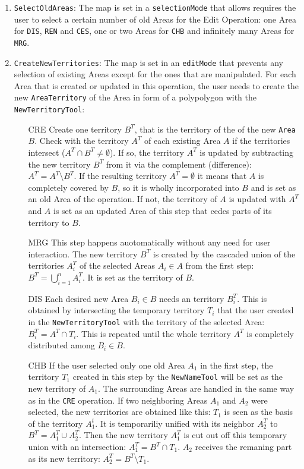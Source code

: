 \begin{enumerate}
  \item \texttt{SelectOldAreas}: The map is set in a \texttt{selectionMode} that allows requires the user to select a certain number of old Areas for the Edit Operation: one Area for \texttt{DIS}, \texttt{REN} and \texttt{CES}, one or two Areas for \texttt{CHB} and infinitely many Areas for \texttt{MRG}.
  \item \texttt{CreateNewTerritories}: The map is set in an \texttt{editMode} that prevents any selection of existing Areas except for the ones that are manipulated. For each Area that is created or updated in this operation, the user needs to create the new \texttt{AreaTerritory} of the Area in form of a polypolygon with the \texttt{NewTerritoryTool}:
  \begin{itemize}
    \item[CRE]
      Create one territory $B^T$, that is the territory of the of the new \texttt{Area} $B$.
      Check with the territory $A^T$ of each existing Area $A$ if the territories intersect ($A^T \cap B^T \neq \emptyset$).
      If so, the territory $A^T$ is updated by subtracting the new territory $B^T$ from it via the complement (difference): $A^T = A^T \setminus B^T$.
      If the resulting territory $A^T = \emptyset$ it means that $A$ is completely covered by $B$, so it is wholly incorporated into $B$ and is set as an old Area of the operation.
      If not, the territory of $A$ is updated with $A^T$ and $A$ is
      set as an updated Area of this step that cedes parts of its territory to $B$.
    \item[MRG]
      This step happens auotomatically without any need for user interaction. The new territory $B^T$ is created by the cascaded union of the territories $A^T_i$ of the selected Areas $A_i \in A$ from the first step: $B^T = \bigcup\limits_{i=1}^n A^T_i$. It is set as the territory of $B$.
    \item[DIS]
      Each desired new Area $B_i \in B$ needs an territory $B_i^T$. This is obtained by intersecting the temporary territory $T_i$ that the user created in the \texttt{NewTerritoryTool} with the territory of the selected Area: $B_i^T = A^T \cap T_i$. This is repeated until the whole territory $A^T$ is completely distributed among $B_i \in B$.
    \item[CHB]
      If the user selected only one old Area $A_1$ in the first step, the territory $T_1$ created in this step by the \texttt{NewNameTool} will be set as the new territory of $A_1$. The surrounding Areas are handled in the same way as in the \texttt{CRE} operation. If two neighboring Areas $A_1$ and $A_2$ were selected, the new territories are obtained like this: $T_1$ is seen as the basis of the territory $A_1^t$. It is temporariliy unified with its neighbor $A^T_2$ to $B^T = A_1^T \cup A_2^T$. Then the new territory $A_1^T$ is cut out off this temporary union with an intersection: $A_1^T = B^T \cap T_1$. $A_2$ receives the remaning part as its new territory: $A_2^T = B^T \setminus T_1$.

\end{itemize}
\end{enumerate}
